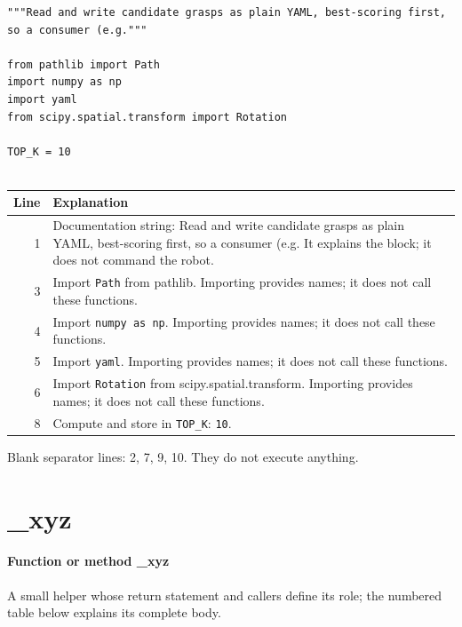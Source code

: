 \documentclass[11pt,a4paper]{book}
\begin{document}
\begin{lstlisting}[firstnumber=1]
"""Read and write candidate grasps as plain YAML, best-scoring first, so a consumer (e.g."""

from pathlib import Path
import numpy as np
import yaml
from scipy.spatial.transform import Rotation

TOP_K = 10


\end{lstlisting}

\begin{longtable}{r p{}}

\textbf{Line} & \textbf{Explanation} \\ \hline \endhead

1 & Documentation string: Read and write candidate grasps as plain YAML, best-scoring first, so a consumer (e.g. It explains the block; it does not command the robot. \\

3 & Import \texttt{Path} from pathlib. Importing provides names; it does not call these functions. \\

4 & Import \texttt{numpy as np}. Importing provides names; it does not call these functions. \\

5 & Import \texttt{yaml}. Importing provides names; it does not call these functions. \\

6 & Import \texttt{Rotation} from scipy.spatial.transform. Importing provides names; it does not call these functions. \\

8 & Compute and store in \texttt{TOP\_K}: \texttt{10}.  \\

\end{longtable}

Blank separator lines: 2, 7, 9, 10. They do not execute anything.

\section{\_xyz}

\paragraph{Function or method \_xyz}
A small helper whose return statement and callers define its role; the numbered table below explains its complete body.
\end{document}

